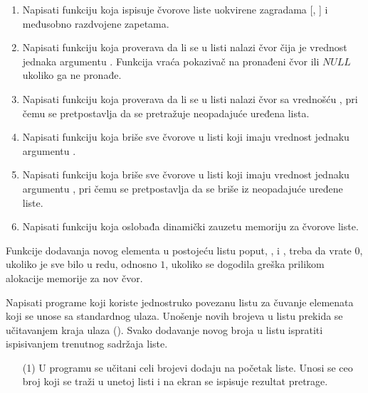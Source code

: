 \begin{Exercise}[label=4_01]
\begin{enumerate}
 \item Napisati funkciju  koja ispisuje čvorove liste uokvirene zagradama [, ] i međusobno razdvojene zapetama.

 \item Napisati funkciju  koja proverava da li se u listi nalazi čvor čija je vrednost jednaka argumentu . Funkcija vraća pokazivač na pronađeni čvor ili $NULL$ ukoliko ga ne pronađe.

 \item Napisati funkciju  koja proverava da li se u listi nalazi čvor sa vrednošću , pri čemu se pretpostavlja da se pretražuje neopadajuće uređena lista.

 \item Napisati funkciju  koja briše sve čvorove u listi koji imaju vrednost jednaku argumentu .

 \item Napisati funkciju  koja briše sve čvorove u listi koji imaju vrednost jednaku argumentu , pri čemu se pretpostavlja da se briše iz neopadajuće uređene liste.

 \item Napisati funkciju  koja oslobađa dinamički zauzetu memoriju za čvorove liste.
 \end{enumerate}

Funkcije dodavanja novog elementa u postojeću listu poput, ,  i , 
treba da vrate $0$, ukoliko je sve bilo u redu, odnosno $1$, ukoliko se dogodila greška prilikom alokacije memorije za nov čvor.

Napisati programe koji koriste jednostruko povezanu listu za čuvanje elemenata koji se unose sa standardnog ulaza.  Unošenje novih brojeva u listu prekida se učitavanjem kraja ulaza (). Svako dodavanje novog broja u listu ispratiti ispisivanjem trenutnog sadržaja liste. 

\begin{enumerate}
\item[(1)] U programu se učitani celi brojevi dodaju na početak liste. 
    Unosi se ceo broj koji se traži u unetoj listi i na ekran se ispisuje rezultat pretrage. 


\end{enumerate}
\end{Exercise}
